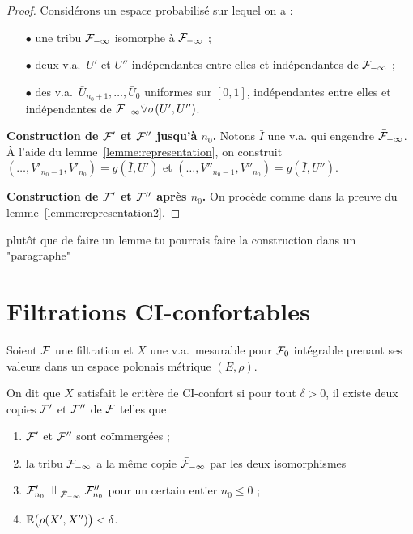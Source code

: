 \documentclass[12pt,a4paper]{article}
\begin{document}
\begin{proof}
Considérons un espace probabilisé sur lequel on a :
\begin{itemize}
\item[$\bullet$] une tribu $\bar{\mathcal{F}}_{-\infty}$ isomorphe à $\mathcal{F}_{-\infty}$ ;

\item[$\bullet$] deux v.a.\ $U'$ et $U''$ indépendantes entre elles et 
indépendantes de $\mathcal{F}_{-\infty}$ ; 

\item[$\bullet$] des v.a.\ $\bar U_{n_0+1}, \ldots, \bar U_0$ uniformes sur 
$[0,1]$, indépendantes entre elles et indépendantes de  
$\mathcal{F}_{-\infty} \dot{\vee} \sigma(U',U'')$.
\end{itemize}

\medskip
\noindent
{\bf Construction de $\mathcal{F}'$ et $\mathcal{F}''$ jusqu'à $n_0$.} 
Notons $\bar I$ une v.a. qui engendre $\bar{\mathcal{F}}_{-\infty}$. 
À l'aide du lemme~\ref{lemme:representation}, 
on construit 
$(\ldots, V'_{n_0-1}, V'_{n_0}) = g(\bar I, U')$ et 
$(\ldots, V''_{n_0-1}, V''_{n_0}) = g(\bar I, U'')$.


\medskip
\noindent
{\bf Construction de $\mathcal{F}'$ et $\mathcal{F}''$ après $n_0$.} 
On procède comme dans la preuve du lemme~\ref{lemme:representation2}.

\end{proof}

plutôt que de faire un lemme tu pourrais faire la construction dans un "paragraphe"

\section{Filtrations CI-confortables}

\begin{definition}\label{def:CIconfort}
Soient $\mathcal{F}$ une filtration et $X$ une v.a.\ mesurable pour $\mathcal{F}_0$ 
intégrable prenant ses valeurs dans un espace polonais métrique $(E,\rho)$. 

On dit que $X$ satisfait le critère de CI-confort si pour tout $\delta>0$, 
il existe deux copies $\mathcal{F}'$ et $\mathcal{F}''$ de $\mathcal{F}$ telles que 
\begin{enumerate}
\item $\mathcal{F}'$ et $\mathcal{F}''$ sont co\"immergées ;

\item la tribu $\mathcal{F}_{-\infty}$ a la m\^eme copie $\bar{\mathcal{F}}_{-\infty}$ par les 
deux isomorphismes 

\item $\FF'_{n_0} \indep_{\bar\FF_{-\infty}} \FF''_{n_0}$ pour un certain entier $n_0 \leq 0$ ;

\item $\mathbb{E}\bigl(\rho(X', X'')\bigr) < \delta$.
\end{enumerate}
\end{definition}
\end{document}
